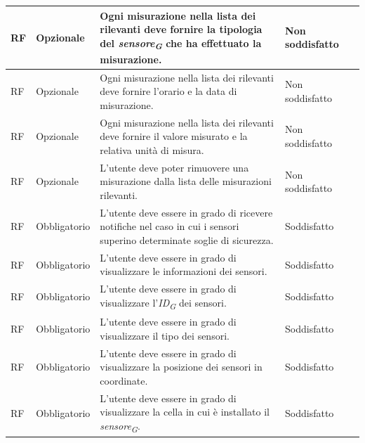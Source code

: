 \begin{longtable}{|C{1.5cm}|C{2cm}|L{5cm}|C{2cm}|C{1.5cm}|}
    \hline
     RF & Opzionale & Ogni misurazione nella lista dei rilevanti deve fornire la tipologia del \textit{sensore}\textsubscript{\textit{G}} che ha effettuato la misurazione.& Non soddisfatto \\

    \hline
     RF & Opzionale & Ogni misurazione nella lista dei rilevanti deve fornire l'orario e la data di misurazione.& Non soddisfatto \\

    \hline
     RF & Opzionale & Ogni misurazione nella lista dei rilevanti deve fornire il valore misurato e la relativa unità di misura.& Non soddisfatto \\

    \hline
     RF & Opzionale & L'utente deve poter rimuovere una misurazione dalla lista delle misurazioni rilevanti.& Non soddisfatto \\

    \hline
     RF & Obbligatorio & L'utente deve essere in grado di ricevere notifiche nel caso in cui i sensori superino determinate soglie di sicurezza.& Soddisfatto \\

    \hline
     RF & Obbligatorio & L'utente deve essere in grado di visualizzare le informazioni dei sensori.& Soddisfatto \\

    \hline
     RF & Obbligatorio & L'utente deve essere in grado di visualizzare l'\textit{ID}\textsubscript{\textit{G}} dei sensori.& Soddisfatto \\

    \hline
     RF & Obbligatorio & L'utente deve essere in grado di visualizzare il tipo dei sensori.& Soddisfatto \\

    \hline
     RF & Obbligatorio & L'utente deve essere in grado di visualizzare la posizione dei sensori in coordinate.& Soddisfatto \\

    \hline
     RF & Obbligatorio & L'utente deve essere in grado di visualizzare la cella in cui è installato il \textit{sensore}\textsubscript{\textit{G}}.& Soddisfatto \\


\end{longtable}
